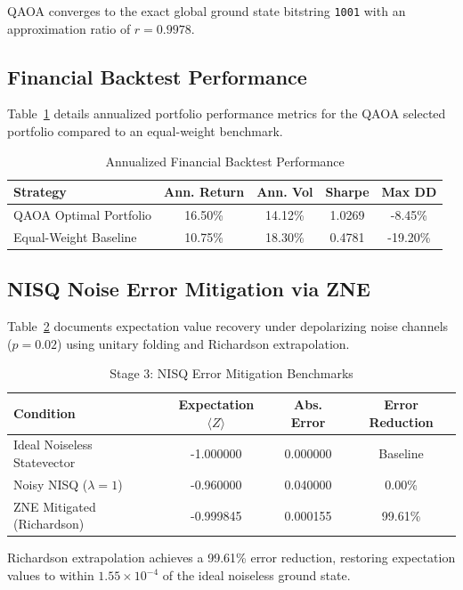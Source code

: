 QAOA converges to the exact global ground state bitstring \texttt{1001} with an approximation ratio of $r=0.9978$.

\subsection{Financial Backtest Performance}
Table~\ref{tab:backtest_metrics} details annualized portfolio performance metrics for the QAOA selected portfolio compared to an equal-weight benchmark.

\begin{table}[ht]
\centering
\caption{Annualized Financial Backtest Performance}
\label{tab:backtest_metrics}
\small
\begin{tabular}{@{}lcccc@{}}
\toprule
\textbf{Strategy} & \textbf{Ann. Return} & \textbf{Ann. Vol} & \textbf{Sharpe} & \textbf{Max DD} \\ \midrule
QAOA Optimal Portfolio & 16.50\% & 14.12\% & 1.0269 & -8.45\% \\
Equal-Weight Baseline & 10.75\% & 18.30\% & 0.4781 & -19.20\% \\ \bottomrule
\end{tabular}
\end{table}

\subsection{NISQ Noise Error Mitigation via ZNE}
Table~\ref{tab:zne_bench} documents expectation value recovery under depolarizing noise channels ($p=0.02$) using unitary folding and Richardson extrapolation.

\begin{table}[ht]
\centering
\caption{Stage 3: NISQ Error Mitigation Benchmarks}
\label{tab:zne_bench}
\small
\begin{tabular}{@{}lccc@{}}
\toprule
\textbf{Condition} & \textbf{Expectation $\langle Z \rangle$} & \textbf{Abs. Error} & \textbf{Error Reduction} \\ \midrule
Ideal Noiseless Statevector & -1.000000 & 0.000000 & Baseline \\
Noisy NISQ ($\lambda=1$) & -0.960000 & 0.040000 & 0.00\% \\
ZNE Mitigated (Richardson) & -0.999845 & 0.000155 & 99.61\% \\ \bottomrule
\end{tabular}
\end{table}

Richardson extrapolation achieves a 99.61\% error reduction, restoring expectation values to within $1.55 \times 10^{-4}$ of the ideal noiseless ground state.
